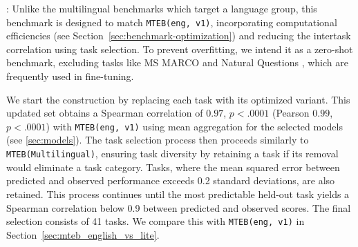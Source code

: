 \noindent
{}:
Unlike the multilingual benchmarks which target a language group, this benchmark is designed to match \texttt{MTEB(eng, v1)}, incorporating computational efficiencies (see Section~\ref{sec:benchmark-optimization}) and reducing the intertask correlation using task selection. To prevent overfitting, we intend it as a zero-shot benchmark, excluding tasks like MS MARCO \citep{NguyenRSGTMD16} and Natural Questions \citep{kwiatkowski2019natural}, which are frequently used in fine-tuning.

We start the construction by replacing each task with its optimized variant. This updated set obtains a Spearman correlation of $0.97$, $p<.0001$ (Pearson $0.99$, $p<.0001$) with \texttt{MTEB(eng, v1)} using mean aggregation for the selected models  (see \autoref{sec:models}).
The task selection process then proceeds similarly to \texttt{MTEB(Multilingual)}, ensuring task diversity by retaining a task if its removal would eliminate a task category. Tasks, where the mean squared error between predicted and observed performance exceeds 0.2 standard deviations, are also retained. This process continues until the most predictable held-out task yields a Spearman correlation below 0.9 between predicted and observed scores. The final selection consists of 41 tasks. We compare this with \texttt{MTEB(eng, v1)} \citep{muennighoff2023mteb} in Section~\ref{sec:mteb_english_vs_lite}.
